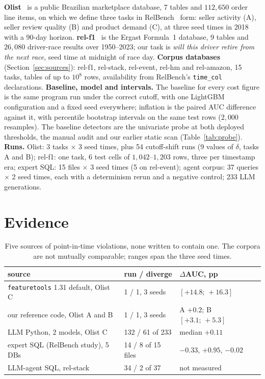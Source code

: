 \documentclass[conference]{IEEEtran}
\begin{document}
\textbf{Olist}~\cite{olist} is a public Brazilian marketplace database, 7 tables and
$112{,}650$ order line items, on which we define three tasks in
RelBench~\cite{relbench} form: seller activity (A), seller review quality (B) and product
demand (C), at three seed times in 2018 with a 90-day horizon.
\textbf{\mbox{rel-f1}}~\cite{relbench} is the Ergast Formula~1 database, 9 tables and
$26{,}080$ driver-race results over 1950--2023; our task is \emph{will this driver retire
from the next race}, seed time at midnight of race day. \textbf{Corpus databases} (Section~\ref{sec:sources}):
\mbox{rel-f1}, \mbox{rel-stack}, \mbox{rel-event}, \mbox{rel-hm} and \mbox{rel-amazon},
15 tasks, tables of up to $10^{8}$ rows, availability from RelBench's \texttt{time\_col}
declarations.
\textbf{Baseline, model and intervals.} The baseline for every cost figure is the same
program run under the correct cutoff, with one LightGBM configuration and a fixed seed
everywhere; inflation is the paired AUC difference against it, with percentile bootstrap
intervals on the same test rows ($2{,}000$ resamples). The baseline detectors are the
univariate probe at both deployed thresholds, the manual audit and our earlier static
scan (Table~\ref{tab:probe}). \textbf{Runs.} Olist: 3 tasks $\times$ 3 seed times, plus
54 cutoff-shift runs (9 values of $\delta$, tasks A and B); \mbox{rel-f1}: one task, 6
test cells of $1{,}042$--$1{,}203$ rows, three per timestamp era; expert SQL: 15 files
$\times$ 3 seed times (5 on \mbox{rel-event}); agent corpus: 37 queries $\times$ 2 seed
times, each with a determinism rerun and a negative control; 233 LLM generations.

\section{Evidence}\label{sec:evidence}

\begin{table}[t]\centering
\caption{Five sources of point-in-time violations, none written to contain one. The corpora are not
mutually comparable; ranges span the three seed times.}
\label{tab:sources}
{\scriptsize\setlength{\tabcolsep}{2.5pt}
\begin{tabular}{@{}lll@{}}
\toprule
source & run / diverge & $\Delta$AUC, pp\\
\midrule
\texttt{featuretools} 1.31 default, Olist C & 1 / 1, 3 seeds & $[+14.8;\,+16.3]$\\
our reference code, Olist A and B & 1 / 1, 3 seeds & A $+0.2$; B $[+3.1;\,+5.3]$\\
LLM Python, 2 models, Olist C & 132 / 61 of 233 & median $+0.11$\\
expert SQL (RelBench study), 5 DBs & 14 / 8 of 15 files & $-0.33$, $+0.95$, $-0.02$\\
LLM-agent SQL, \mbox{rel-stack} & 34 / 2 of 37 & not measured\\
\bottomrule
\end{tabular}}
\end{table}
\end{document}
